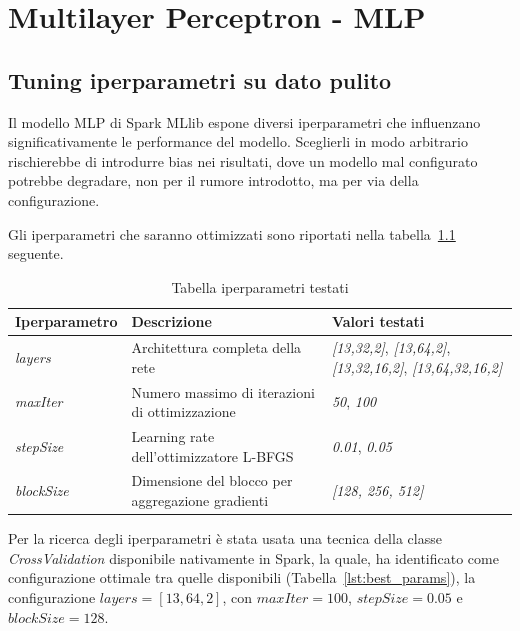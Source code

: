 \documentclass[../main.tex]{subfiles}
\begin{document}
\chapter{Multilayer Perceptron - MLP}
\label{chap:MLP}

\section{Tuning iperparametri su dato pulito}
Il modello MLP di Spark MLlib espone diversi iperparametri che influenzano significativamente le performance del modello. Sceglierli in modo arbitrario rischierebbe di introdurre bias nei risultati, dove un modello mal configurato potrebbe degradare, non per il rumore introdotto, ma per via della configurazione.

Gli iperparametri che saranno ottimizzati sono riportati nella tabella~\ref{tab:iperparametri} seguente.

\begin{table}[H]
    \centering
    \begin{tabular}{|l|p{6cm}|p{5cm}|}
        \hline
        \textbf{Iperparametro} & \textbf{Descrizione} & \textbf{Valori testati} \\
        \hline
        \textit{layers}
          & Architettura completa della rete & \textit{[13,32,2]}, \textit{[13,64,2]}, \textit{[13,32,16,2]}, \textit{[13,64,32,16,2]} \\ \hline
        \textit{maxIter}
          & Numero massimo di iterazioni di ottimizzazione & \textit{50}, \textit{100} \\ \hline
        \textit{stepSize}
          & Learning rate dell'ottimizzatore L-BFGS & \textit{0.01}, \textit{0.05} \\ \hline
        \textit{blockSize}
          & Dimensione del blocco per aggregazione gradienti & \textit{[128, 256, 512]} \\ \hline
    \end{tabular}
    \caption{Tabella iperparametri testati}
    \label{tab:iperparametri}
\end{table}
\newpage

Per la ricerca degli iperparametri è stata usata una tecnica della classe \textit{CrossValidation} disponibile nativamente in Spark, la quale, ha identificato come configurazione ottimale tra quelle disponibili (Tabella~\ref{lst:best_params}), la configurazione $\textit{layers} = [13, 64, 2]$, con $\textit{maxIter} = 100$, $\textit{stepSize} = 0.05$ e $\textit{blockSize} = 128$.
\end{document}
